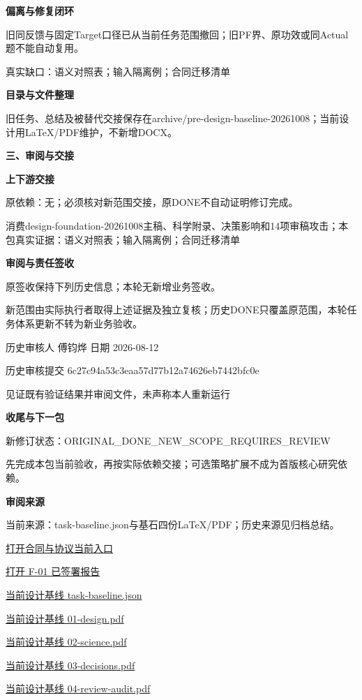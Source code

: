 \documentclass[11pt,a4paper]{article}
\newcommand{\reviewsection}[1]{\par\Needspace{5\baselineskip}\vspace{10pt}\begin{center}{\titlelatin\titlecjk\bfseries\fontsize{14}{20}\selectfont #1}\end{center}}
\newcommand{\reviewsubsection}[1]{\par\Needspace{4\baselineskip}\vspace{4pt}\begin{center}{\titlelatin\titlecjk\bfseries\fontsize{12}{18}\selectfont #1}\end{center}}
\begin{document}
\reviewsubsection{2.3 偏离与修复闭环}
旧同反馈与固定Target口径已从当前任务范围撤回；旧PF界、原功效或同Actual题不能自动复用。


真实缺口：语义对照表；输入隔离例；合同迁移清单


\reviewsubsection{2.4 目录与文件整理}
旧任务、总结及被替代交接保存在archive/\allowbreak{}pre-\allowbreak{}design-\allowbreak{}baseline-\allowbreak{}20261008；当前设计用LaTeX/\allowbreak{}PDF维护，不新增DOCX。


\reviewsection{三、审阅与交接}
\reviewsubsection{3.1 上下游交接}
原依赖：无；必须核对新范围交接，原DONE不自动证明修订完成。


消费design-\allowbreak{}foundation-\allowbreak{}20261008主稿、科学附录、决策影响和14项审稿攻击；本包真实证据：语义对照表；输入隔离例；合同迁移清单


\reviewsubsection{3.2 审阅与责任签收}
原签收保持下列历史信息；本轮无新增业务签收。


新范围由实际执行者取得上述证据及独立复核；历史DONE只覆盖原范围，本轮任务体系更新不转为新业务验收。


历史审核人 傅钧烨    日期 2026-\allowbreak{}08-\allowbreak{}12


历史审核提交 6c27c94a\allowbreak{}53c3eaa5\allowbreak{}7d77b12a\allowbreak{}74626eb7\allowbreak{}442bfc0e


见证既有验证结果并审阅文件，未声称本人重新运行


\reviewsubsection{3.3 收尾与下一包}
新修订状态：ORIGINAL\_\allowbreak{}DONE\_\allowbreak{}NEW\_\allowbreak{}SCOPE\_\allowbreak{}REQUIRES\_\allowbreak{}REVIEW


先完成本包当前验收，再按实际依赖交接；可选策略扩展不成为首版核心研究依赖。


\reviewsubsection{3.4 审阅来源}
当前来源：task-\allowbreak{}baseline.json与基石四份LaTeX/\allowbreak{}PDF；历史来源见归档总结。


\href{file:///D:/Agent/srp/agent/modules/communication/contracts/README.md}{打开合同与协议当前入口}


\href{file:///D:/Agent/srp/agent/modules/communication/F-01_\%E7\%AC\%AC\%E4\%BA\%8C\%E4\%BA\%BA\%E5\%AE\%A1\%E6\%A0\%B8\%E6\%8A\%A5\%E5\%91\%8A_\%E5\%B7\%B2\%E7\%AD\%BE\%E7\%BD\%B2.md}{打开 F-\allowbreak{}01 已签署报告}


\href{file:///D:/Agent/srp/agent/design/design-foundation-20261008/task-baseline.json}{当前设计基线 task-\allowbreak{}baseline.json}


\href{file:///D:/Agent/srp/agent/design/design-foundation-20261008/01-design.pdf}{当前设计基线 01-\allowbreak{}design.pdf}


\href{file:///D:/Agent/srp/agent/design/design-foundation-20261008/02-science.pdf}{当前设计基线 02-\allowbreak{}science.pdf}


\href{file:///D:/Agent/srp/agent/design/design-foundation-20261008/03-decisions.pdf}{当前设计基线 03-\allowbreak{}decisions.pdf}


\href{file:///D:/Agent/srp/agent/design/design-foundation-20261008/04-review-audit.pdf}{当前设计基线 04-\allowbreak{}review-\allowbreak{}audit.pdf}
\end{document}
